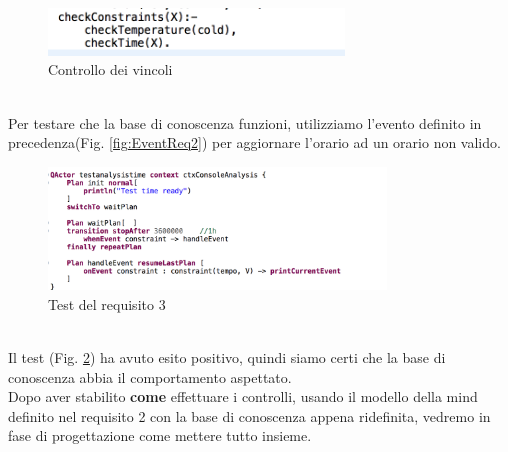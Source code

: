 \documentclass{llncs}
\begin{document}
\begin{figure}
    \centering
    \includegraphics[width=0.7\textwidth]{Immagini/Requisito3/CheckConstraintReq3.png}
    \caption{Controllo dei vincoli}
    \label{fig:checkConstraint}
\end{figure}
\vspace*{1ex}
\\
Per testare che la base di conoscenza funzioni, utilizziamo l'evento  definito in precedenza(Fig. \hyperref[fig:EventReq2]{\ref{fig:EventReq2}}) per aggiornare l'orario ad un orario non valido.\\
\begin{figure}
    \centering
    \includegraphics[width=0.8\textwidth]{Immagini/Requisito3/TestReq3.png}
    \caption{Test del requisito 3}
    \label{fig:TestReq3}
\end{figure}
\vspace*{1ex}
\\
Il test (Fig. \hyperref[fig:TestReq3]{\ref{fig:TestReq3}}) ha avuto esito positivo, quindi siamo certi che la base di conoscenza abbia il comportamento aspettato.\\
Dopo aver stabilito \textbf{come} effettuare i controlli, usando il modello della mind definito nel requisito 2 con la base di conoscenza appena ridefinita, vedremo in fase di progettazione come mettere tutto insieme.

\end{document}
